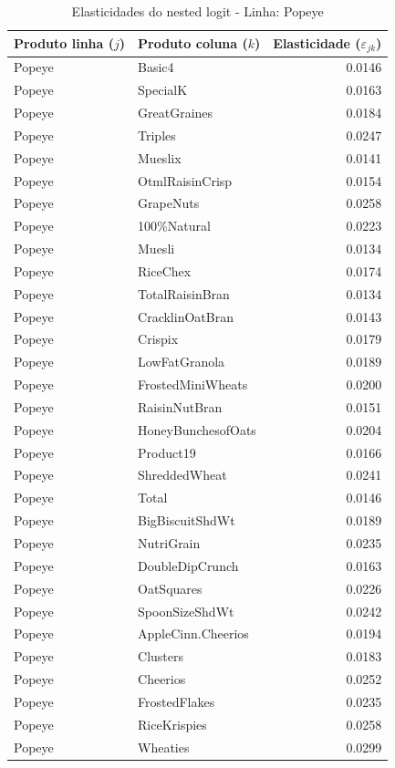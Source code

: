 \begingroup
\begin{table}[H]
\centering
\caption{Elasticidades do nested logit - Linha: Popeye}
\label{tab:elas-nested-popeye}
\small
\begin{tabular}{llr}
\toprule
Produto linha ($j$) & Produto coluna ($k$) & Elasticidade ($\varepsilon_{jk}$) \\
\midrule
Popeye & Basic4 & 0.0146 \\
Popeye & SpecialK & 0.0163 \\
Popeye & GreatGraines & 0.0184 \\
Popeye & Triples & 0.0247 \\
Popeye & Mueslix & 0.0141 \\
Popeye & OtmlRaisinCrisp & 0.0154 \\
Popeye & GrapeNuts & 0.0258 \\
Popeye & 100\%Natural & 0.0223 \\
Popeye & Muesli & 0.0134 \\
Popeye & RiceChex & 0.0174 \\
Popeye & TotalRaisinBran & 0.0134 \\
Popeye & CracklinOatBran & 0.0143 \\
Popeye & Crispix & 0.0179 \\
Popeye & LowFatGranola & 0.0189 \\
Popeye & FrostedMiniWheats & 0.0200 \\
Popeye & RaisinNutBran & 0.0151 \\
Popeye & HoneyBunchesofOats & 0.0204 \\
Popeye & Product19 & 0.0166 \\
Popeye & ShreddedWheat & 0.0241 \\
Popeye & Total & 0.0146 \\
Popeye & BigBiscuitShdWt & 0.0189 \\
Popeye & NutriGrain & 0.0235 \\
Popeye & DoubleDipCrunch & 0.0163 \\
Popeye & OatSquares & 0.0226 \\
Popeye & SpoonSizeShdWt & 0.0242 \\
Popeye & AppleCinn.Cheerios & 0.0194 \\
Popeye & Clusters & 0.0183 \\
Popeye & Cheerios & 0.0252 \\
Popeye & FrostedFlakes & 0.0235 \\
Popeye & RiceKrispies & 0.0258 \\
Popeye & Wheaties & 0.0299 \\

\end{tabular}
\end{table}
